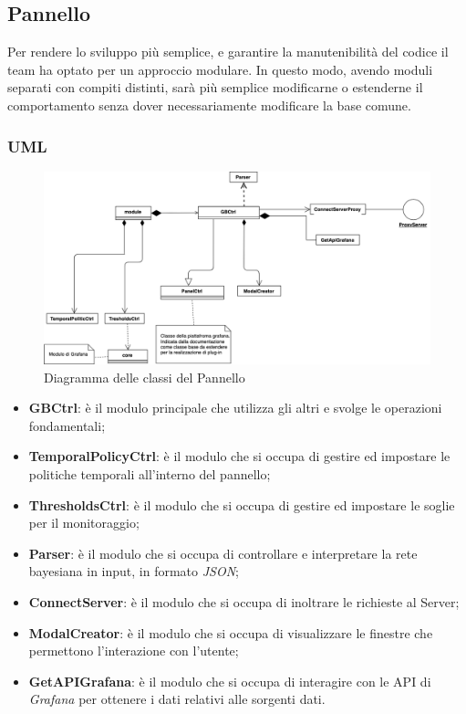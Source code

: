 \subsection{Pannello}\label{archPannello}
Per rendere lo sviluppo più semplice, e garantire la manutenibilità del codice il team ha optato per un approccio modulare. In questo modo, avendo moduli separati con compiti distinti, sarà più semplice modificarne o estenderne il comportamento senza dover necessariamente modificare la base comune.\\


\subsubsection{UML}
\begin{figure}[H]
	\includegraphics[width=\textwidth]{./images/plugin_non_espanso.png}
	\caption{Diagramma delle classi del Pannello}
\end{figure}

\begin{itemize}
	\item \textbf{GBCtrl}: è il modulo principale che utilizza gli altri e svolge le operazioni fondamentali;
	\item \textbf{TemporalPolicyCtrl}: è il modulo che si occupa di gestire ed impostare le politiche temporali all'interno del pannello;
	\item \textbf{ThresholdsCtrl}: è il modulo che si occupa di gestire ed impostare le soglie per il monitoraggio;
	\item \textbf{Parser}: è il modulo che si occupa di controllare e interpretare la rete bayesiana in input, in formato \textit{JSON};
	\item \textbf{ConnectServer}: è il modulo che si occupa di inoltrare le richieste al Server;
	\item \textbf{ModalCreator}: è il modulo che si occupa di visualizzare le finestre che permettono l'interazione con l'utente;
	\item \textbf{GetAPIGrafana}: è il modulo che si occupa di interagire con le API di \textit{Grafana} per ottenere i dati relativi alle sorgenti dati.
\end{itemize}

